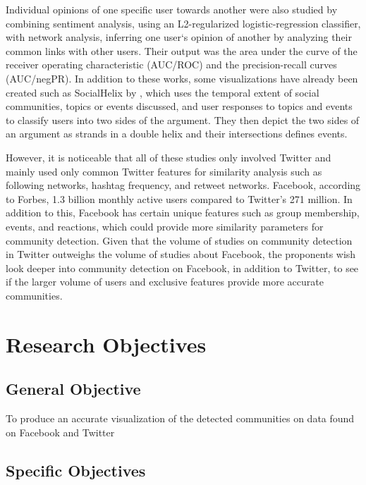 Individual opinions of one specific user towards another were also studied by  combining sentiment analysis, using an L2-regularized logistic-regression classifier, with network analysis, inferring one user`s opinion of another by analyzing their common links with other users. Their output was the area under the curve of the receiver operating characteristic (AUC/ROC) and the precision-recall curves (AUC/negPR). In addition to these works, some visualizations have already been created such as SocialHelix by , which uses the temporal extent of social communities, topics or events discussed, and user responses to topics and events to classify users into two sides of the argument. They then depict the two sides of an argument as strands in a double helix and their intersections defines events.

However, it is noticeable that all of these studies only involved Twitter and mainly used only common Twitter features for similarity analysis such as following networks, hashtag frequency, and retweet networks. Facebook, according to Forbes, 1.3 billion monthly active users compared to Twitter's 271 million. In addition to this, Facebook has certain unique features such as group membership, events, and reactions, which could provide more similarity parameters for community detection. Given that the volume of studies on community detection in Twitter outweighs the volume of studies about Facebook, the proponents wish look deeper into community detection on Facebook, in addition to Twitter, to see if the larger volume of users and exclusive features provide more accurate communities.

\section{Research Objectives}
\label{sec:researchobjectives}

\subsection{General Objective}
\label{sec:generalobjective}

To produce an accurate visualization of the detected communities on data found on Facebook and Twitter

\subsection{Specific Objectives}
\label{sec:specificobjectives}

